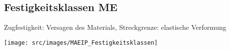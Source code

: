 \subsection{Festigkeitsklassen \hfill ME}
\begin{footnotesize}
    Zugfestigkeit: Versagen des Materials, Streckgrenze: elastische Verformung
    \begin{center}
        \texttt{[image: src/images/MAEIP\_Festigkeitsklassen]}
    \end{center}
\end{footnotesize}
